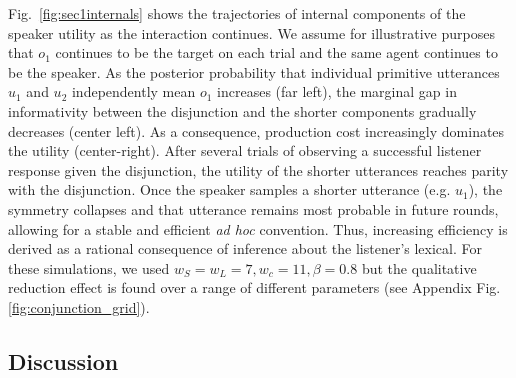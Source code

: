 Fig.~\ref{fig:sec1internals} shows the trajectories of internal components of the speaker utility as the interaction continues.
We assume for illustrative purposes that $o_1$ continues to be the target on each trial and the same agent continues to be the speaker.
As the posterior probability that individual primitive utterances $u_1$ and $u_2$ independently mean $o_1$ increases (far left), the marginal gap in informativity between the disjunction and the shorter components gradually decreases (center left).
As a consequence, production cost increasingly dominates the utility (center-right). 
After several trials of observing a successful listener response given the disjunction, the utility of the shorter utterances reaches parity with the disjunction.
Once the speaker samples a shorter utterance (e.g. $u_1$), the symmetry collapses and that utterance remains most probable in future rounds, allowing for a stable and efficient \emph{ad hoc} convention.
Thus, increasing efficiency is derived as a rational consequence of inference about the listener's lexical.
For these simulations, we used $w_S = w_L = 7, w_c = 11, \beta=0.8$ but the qualitative reduction effect is found over a range of different parameters (see Appendix Fig. \ref{fig:conjunction_grid}). 
%
%
%




\subsection{Discussion}

